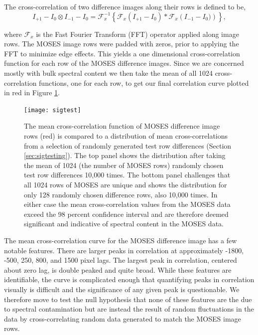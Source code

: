 		The cross-correlation of two difference images along their rows is defined to be,
	 	\begin{equation}
		 	I_{+1}-I_0 \otimes I_{-1}-I_0 = \mathcal{F}_x^{-1} \left\{\mathcal{F}_x\left(I_{+1}-I_0 \right)*\mathcal{F}_x\left( I_{-1}-I_0) \right)  \right\},
		 	\label{eqn:cross_correlate}
	 	\end{equation}
        
	 	where $\mathcal{F}_x$ is the Fast Fourier Transform (FFT) operator applied along image rows.  
	 	The MOSES image rows were padded with zeros, prior to applying the FFT to minimize edge effects.   	
		This yields a one dimensional cross-correlation function for each row of the MOSES difference images.  
		Since we are concerned mostly with bulk spectral content we then take the mean of all 1024 cross-correlation functions, one for each row, to get our final correlation curve plotted in red in Figure \ref{fig:sigtest}. 
		 
		 \begin{figure}
		 	\centering
		 	\texttt{[image: sigtest]}
		 	\caption{The mean cross-correlation function of MOSES difference image rows (red) is compared to a distribution of mean cross-correlations from a selection of randomly generated test row differences (Section \ref{sec:sigtesting}). 
		 	The top panel shows the distribution after taking the mean of 1024 (the number of MOSES rows) randomly chosen test row differences 10,000 times.  
		 	The bottom panel challenges that all 1024 rows of MOSES are unique and shows the distribution for only 128 randomly chosen difference rows, also 10,000 times.  
		 	In either case the mean cross-correlation values from the MOSES data exceed the 98 percent confidence interval and are therefore deemed significant and indicative of spectral content in the MOSES data.}
		 	\label{fig:sigtest}
		 \end{figure}
		 
	 
		 The mean cross-correlation curve for the MOSES difference image has a few notable features.  
		 There are larger peaks in correlation  at approximately -1800, -500, 250, 800, and 1500 pixel lags.  
		 The largest peak in correlation, centered about zero lag, is double peaked and quite broad.   
		 While these features are identifiable, the curve is complicated enough that quantifying peaks in correlation visually is difficult and the significance of any given peak is questionable. 
		 We therefore move to test the null hypothesis that none of these features are the due to spectral contamination but are instead the result of random fluctuations in the data by cross-correlating random data generated to match the MOSES image rows.
 
